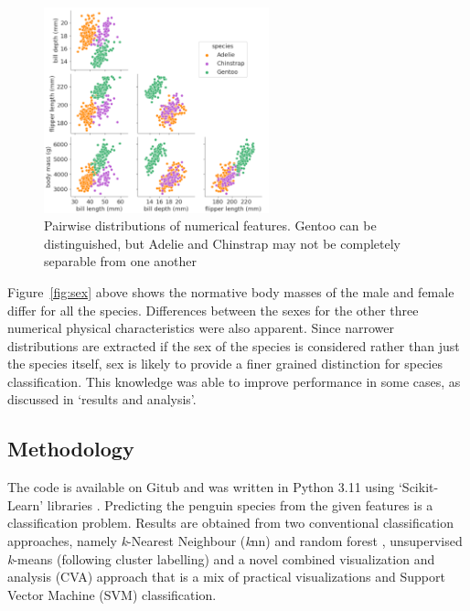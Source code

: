 \documentclass[a4paper, 11pt]{article}
\begin{document}
\begin{figure} %
  \centering
  \vspace{-1\baselineskip} %
  \includegraphics[width=0.58\textwidth]{pairwise.png} %
  \vspace{-1.5\baselineskip} %
  \caption{\centering\linespread{0.8}\selectfont Pairwise distributions of numerical features. Gentoo can be distinguished, 
  but Adelie and Chinstrap may not be completely separable from one another}
  \vspace{-2.5\baselineskip} %
  \label{fig:pairwise}
\end{figure}

Figure~\ref{fig:sex} above shows the normative body masses of the male and female differ for all the species. 
Differences between the sexes for the other three numerical physical characteristics were also apparent. 
Since narrower distributions are extracted if the sex of the species is considered rather than just the species itself, 
sex is likely to provide a finer grained distinction for species classification. 
This knowledge was able to improve performance in some cases, as discussed in `results and analysis'. 

\subsection*{Methodology}

The code is available on Gitub \cite{TimAIRepo} and was written in Python 3.11 \cite{python311} 
using ‘Scikit-Learn’ libraries \cite{scikit-learn}.
Predicting the penguin species from the given features is a classification problem. 
Results are obtained from two conventional classification approaches, 
namely \textit{k}-Nearest Neighbour (\textit{k}nn) \cite{bishop2006pattern} and random forest \cite{breiman2001random}, 
unsupervised \textit{k}-means (following cluster labelling) \cite{tan2005introduction} 
and a novel combined visualization and analysis (CVA) approach that is a mix of 
practical visualizations and Support Vector Machine (SVM) classification.
\end{document}
